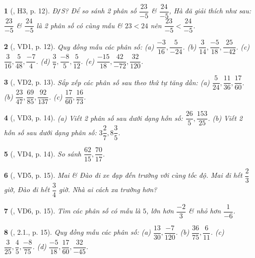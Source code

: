 \documentclass{article}
\newtheorem{baitoan}{}
\begin{document}
\begin{baitoan}[\cite{Binh_boi_duong_Toan_6_tap_2}, H3, p. 12]
	{\rm Đ{\tt/}S?} Để so sánh 2 phân số $\dfrac{23}{-5}$ \&  $\dfrac{24}{-5}$, Hà đã giải thích như sau: $\dfrac{23}{-5}$ \&  $\dfrac{24}{-5}$ là 2 phân số có cùng mẫu \& $23 < 24$ nên $\dfrac{23}{-5} < \dfrac{24}{-5}$.
\end{baitoan}

\begin{baitoan}[\cite{Binh_boi_duong_Toan_6_tap_2}, VD1, p. 12]
	Quy đồng mẫu các phân số: (a) $\dfrac{-3}{16},\dfrac{5}{-24}$. (b) $\dfrac{3}{14},\dfrac{-5}{18},\dfrac{25}{-42}$. (c) $\dfrac{3}{16},\dfrac{5}{48},\dfrac{-7}{4}$. (d) $\dfrac{3}{7},\dfrac{-8}{5},\dfrac{5}{12}$. (e) $\dfrac{-15}{18},\dfrac{42}{-72},\dfrac{32}{120}$.
\end{baitoan}

\begin{baitoan}[\cite{Binh_boi_duong_Toan_6_tap_2}, VD2, p. 13]
	Sắp xếp các phân số sau theo thứ tự tăng dần: (a) $\dfrac{5}{24},\dfrac{11}{36},\dfrac{17}{60}$. (b) $\dfrac{23}{47},\dfrac{69}{85},\dfrac{92}{137}$. (c) $\dfrac{17}{60},\dfrac{16}{73}$.
\end{baitoan}

\begin{baitoan}[\cite{Binh_boi_duong_Toan_6_tap_2}, VD3, p. 14]
	(a) Viết 2 phân số sau dưới dạng hỗn số: $\dfrac{26}{5},\dfrac{153}{25}$. (b) Viết 2 hỗn số sau dưới dạng phân số: $3\dfrac{2}{7},8\dfrac{3}{5}$.
\end{baitoan}

\begin{baitoan}[\cite{Binh_boi_duong_Toan_6_tap_2}, VD4, p. 14]
	So sánh $\dfrac{62}{15},\dfrac{70}{17}$.
\end{baitoan}

\begin{baitoan}[\cite{Binh_boi_duong_Toan_6_tap_2}, VD5, p. 15]
	Mai \& Đào đi xe đạp đến trường với cùng tốc độ. Mai đi hết $\dfrac{2}{3}$ giờ, Đào đi hết $\dfrac{3}{4}$ giờ. Nhà ai cách xa trường hơn?
\end{baitoan}

\begin{baitoan}[\cite{Binh_boi_duong_Toan_6_tap_2}, VD6, p. 15]
	Tìm các phân số có mẫu là $5$, lớn hơn $\dfrac{-2}{3}$ \& nhỏ hơn $\dfrac{1}{-6}$.
\end{baitoan}

\begin{baitoan}[\cite{Binh_boi_duong_Toan_6_tap_2}, 2.1., p. 15]
	Quy đồng mẫu các phân số: (a) $\dfrac{13}{30},\dfrac{-7}{120}$. (b) $\dfrac{36}{75},\dfrac{6}{11}$. (c) $\dfrac{3}{25},\dfrac{4}{5},\dfrac{-8}{75}$. (d) $\dfrac{-5}{18},\dfrac{17}{60},\dfrac{32}{-45}$.
\end{baitoan}
\end{document}
